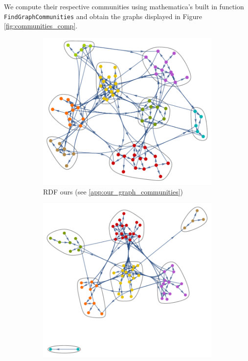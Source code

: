 \documentclass[english, 12pt]{article}
\begin{document}
We compute their respective communities using mathematica's built in function \texttt{FindGraphCommunities} and obtain the graphs displayed in Figure \ref{fig:communities_comp}.
\begin{figure}
    \centering
    \begin{subfigure}[b]{0.35\textwidth}
        \centering
        \includegraphics[height=\textwidth]{CommunitiesRDFours.pdf}
        \caption{RDF ours (see \ref{app:our_graph_communities})}
    \end{subfigure}
    \hfil
    \begin{subfigure}[b]{0.35\textwidth}
        \centering
        \includegraphics[height=\textwidth]{CommunitiesRDFother.pdf}

\end{subfigure}
\end{figure}
\end{document}
